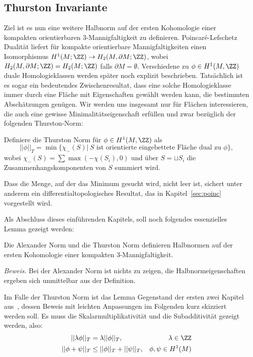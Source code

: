     \subsection{Thurston Invariante}

        Ziel ist es nun eine weitere Halbnorm auf der ersten Kohomologie einer kompakten orientierbaren 3-Mannigfaltigkeit zu definieren. Poincaré-Lefschetz Dualität liefert für kompakte orientierbare Mannigfaltigkeiten einen Isomorphismus $H^1(M;\ZZ) \to H_2(M,\partial M;\ZZ)$, wobei $H_2(M,\partial M;\ZZ)=H_2(M;\ZZ)$ falls $\partial M=\emptyset$. Verschiedene zu $\phi \in H^1(M,\ZZ)$ duale Homologieklassen werden später noch explizit beschrieben. Tatsächlich ist es sogar ein bedeutendes Zwischenresultat, dass eine solche Homologieklasse immer durch eine Fläche mit Eigenschaften gewählt werden kann, die bestimmten Abschätzungen genügen. Wir werden uns insgesamt nur für Flächen interessieren, die auch eine gewisse Minimalitätseigenschaft erfüllen und zwar bezüglich der folgenden Thurston-Norm:
        \begin{defn}
        	Definiere die Thurston Norm für $\phi \in H^1(M,\ZZ)$ als
        	\[
        	        		||\phi||_T = \min\{ \chi_-(S)| ~S\text{ ist orientierte eingebettete Fläche dual zu } \phi \},
        	        	\]        	
        	wobei $\chi_-(S)=\sum \max (-\chi(S_i),0)$ und über $S=\sqcup S_i$ die Zusammenhangskomponenten von $S$ summiert wird.
        \end{defn}
        Dass die Menge, auf der das Minimum gesucht wird, nicht leer ist, sichert unter anderem ein differentialtopologisches Resultat, das in Kapitel~\ref{sec:poinc} vorgestellt wird.

        Als Abschluss dieses einführenden Kapitels, soll noch folgendes essenzielles Lemma gezeigt werden:
        \begin{lem}
        \label{lem:norm}
        	Die Alexander Norm und die Thurston Norm definieren Halbnormen auf der ersten Kohomologie einer kompakten 3-Mannigfaltigkeit. 
        \end{lem}
          \noindent\textit{Beweis.}
            Bei der Alexander Norm ist nichts zu zeigen, die Halbnormeigenschaften ergeben sich unmittelbar aus der Definition.

            Im Falle der Thurston Norm ist das Lemma Gegenstand der ersten zwei Kapitel aus~\cite{Thurston.1986}, dessen Beweis mit leichten Anpassungen im Folgenden kurz skizziert werden soll.
            Es muss die Skalarmultiplikativität und die Subadditivität gezeigt werden, also:
            \begin{align}
                ||\lambda\phi||_T & = \lambda ||\phi||_T ,&\lambda \in\ZZ \label{eq:scalarmul} \\
                ||\phi + \psi||_T &\leq ||\phi||_T + ||\psi||_T ,& \phi,\psi \in H^1(M) \label{eq:subadd}
            \end{align} 


